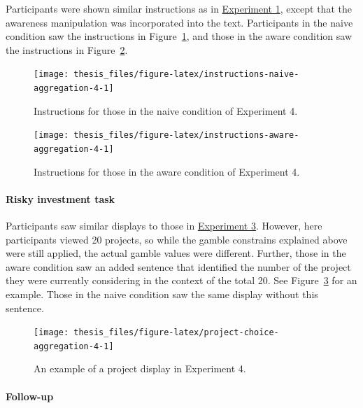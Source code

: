 \documentclass[a4paper, nobind, dvipsnames]{templates/ociamthesis}
\theoremstyle{definition}
\theoremstyle{definition}
\theoremstyle{definition}
\theoremstyle{definition}
\theoremstyle{remark}
\begin{document}
Participants were shown similar instructions as in
\protect\hyperlink{instructions-materials-aggregation-1}{Experiment 1}, except that the awareness
manipulation was incorporated into the text. Participants in the naive condition
saw the instructions in Figure~\ref{fig:instructions-naive-aggregation-4}, and
those in the aware condition saw the instructions in
Figure~\ref{fig:instructions-aware-aggregation-4}.



\begin{figure}
\texttt{[image: thesis\_files/figure-latex/instructions-naive-aggregation-4-1]} \caption{Instructions for those in the naive condition of Experiment 4.}\label{fig:instructions-naive-aggregation-4}
\end{figure}



\begin{figure}
\texttt{[image: thesis\_files/figure-latex/instructions-aware-aggregation-4-1]} \caption{Instructions for those in the aware condition of Experiment 4.}\label{fig:instructions-aware-aggregation-4}
\end{figure}

\paragraph{Risky investment task}

Participants saw similar displays to those in
\protect\hyperlink{task-aggregation-3}{Experiment 3}. However, here participants viewed 20
projects, so while the gamble constrains explained above were still applied, the
actual gamble values were different. Further, those in the aware condition saw
an added sentence that identified the number of the project they were currently
considering in the context of the total 20. See
Figure~\ref{fig:project-choice-aggregation-4} for an example. Those in the
naive condition saw the same display without this sentence.



\begin{figure}
\texttt{[image: thesis\_files/figure-latex/project-choice-aggregation-4-1]} \caption{An example of a project display in Experiment 4.}\label{fig:project-choice-aggregation-4}
\end{figure}

\paragraph{Follow-up}
\end{document}
